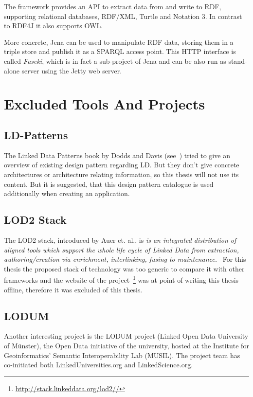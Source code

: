 The framework provides an API to extract data from and write to RDF, supporting relational databases, RDF/XML, Turtle and Notation 3. In contrast to RDF4J it also supports OWL.

More concrete, Jena can be used to manipulate RDF data, storing them in a triple store and publish it as a SPARQL access point. This HTTP interface is called \emph{Fuseki}, which is in fact a sub-project of Jena and can be also run as stand-alone server using the Jetty web server.

\newpage
\section{Excluded Tools And Projects}\label{excluded}

\subsection{LD-Patterns}
The Linked Data Patterns book by Dodds and Davis (see~\cite{dodds2011linked}) tried to give an overview of existing design pattern regarding LD. But they don't give concrete architectures or architecture relating information, so this thesis will not use its content. But it is suggested, that this design pattern catalogue is used additionally when creating an application.

\subsection{LOD2 Stack}

The LOD2 stack, introduced by Auer et. al., is \emph{is an integrated distribution of aligned tools which support the whole life cycle of Linked Data from extraction, authoring/creation via enrichment, interlinking, fusing to maintenance.}~\cite{auer2012managing} For this thesis the proposed stack of technology was too generic to compare it with other frameworks and the website of the project~\footnote{\url{http://stack.linkeddata.org/lod2//}} was at point of writing this thesis offline, therefore it was excluded of this thesis.

\subsection{LODUM}

Another interesting project is the LODUM project (Linked Open Data University of Münster), the Open Data initiative of the university, hosted at the Institute for Geoinformatics' Semantic Interoperability Lab (MUSIL). The project team has co-initiated both LinkedUniversities.org and LinkedScience.org.

